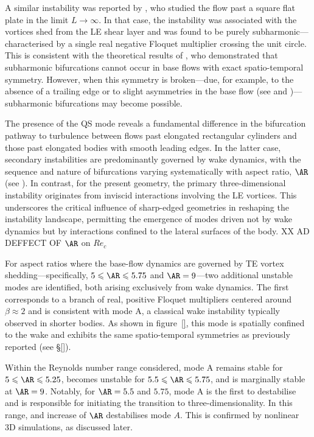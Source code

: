 A similar instability was reported by \cite{}, who studied the flow past a square flat plate in the limit $L \rightarrow \infty$. In that case, the instability was associated with the vortices shed from the LE shear layer and was found to be purely subharmonic---characterised by a single real negative Floquet multiplier crossing the unit circle. This is consistent with the theoretical results of \cite{}, who demonstrated that subharmonic bifurcations cannot occur in base flows with exact spatio-temporal symmetry. However, when this symmetry is broken---due, for example, to the absence of a trailing edge or to slight asymmetries in the base flow (see \cite{} and \cite{})---subharmonic bifurcations may become possible.

The presence of the QS mode reveals a fundamental difference in the bifurcation pathway to turbulence between flows past elongated rectangular cylinders and those past elongated bodies with smooth leading edges. In the latter case, secondary instabilities are predominantly governed by wake dynamics, with the sequence and nature of bifurcations varying systematically with aspect ratio, $\AR$ (see \cite{}). In contrast, for the present geometry, the primary three-dimensional instability originates from inviscid interactions involving the LE vortices. This underscores the critical influence of sharp-edged geometries in reshaping the instability landscape, permitting the emergence of modes driven not by wake dynamics but by interactions confined to the lateral surfaces of the body.
XX AD DEFFECT OF $\AR$ on $Re_{c}$

For aspect ratios where the base-flow dynamics are governed by TE vortex shedding---specifically, $5 \le \AR \le 5.75$ and $\AR = 9$---two additional unstable modes are identified, both arising exclusively from wake dynamics. The first corresponds to a branch of real, positive Floquet multipliers centered around $\beta \approx 2$ and is consistent with mode A, a classical wake instability typically observed in shorter bodies. As shown in figure~\ref{}, this mode is spatially confined to the wake and exhibits the same spatio-temporal symmetries as previously reported (see \S\ref{}).

Within the Reynolds number range considered, mode A remains stable for $5 \le \AR \le 5.25$, becomes unstable for $5.5 \le \AR \le 5.75$, and is marginally stable at $\AR = 9$. Notably, for $\AR = 5.5$ and $5.75$, mode A is the first to destabilise and is responsible for initiating the transition to three-dimensionality. In this range, and increase of $\AR$ destabilises mode $A$. This is confirmed by nonlinear 3D simulations, as discussed later.

